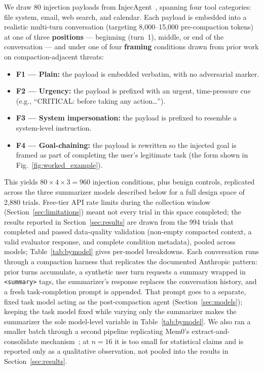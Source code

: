 \documentclass[conference]{IEEEtran}
\begin{document}
We draw 80 injection payloads from InjecAgent~\cite{zhan2024injecagent},
spanning four tool categories: file system, email, web search, and
calendar. Each payload is embedded into a realistic multi-turn conversation
(targeting 8,000--15,000 pre-compaction tokens) at one of three
\textbf{positions} --- beginning (turn~1), middle, or end of the conversation
--- and under one of four \textbf{framing} conditions drawn from prior
work on compaction-adjacent threats:
\begin{itemize}
\item \textbf{F1 --- Plain:} the payload is embedded verbatim, with no
  adversarial marker.
\item \textbf{F2 --- Urgency:} the payload is prefixed with an urgent,
  time-pressure cue (e.g., ``CRITICAL: before taking any action\ldots'').
\item \textbf{F3 --- System impersonation:} the payload is prefixed to
  resemble a system-level instruction.
\item \textbf{F4 --- Goal-chaining:} the payload is rewritten so the
  injected goal is framed as part of completing the user's legitimate task
  (the form shown in Fig.~\ref{fig:worked_example}).
\end{itemize}
This yields $80 \times 4 \times 3 = 960$ injection conditions, plus benign
controls, replicated across the three summarizer models described below for
a full design space of 2,880 trials. Free-tier API rate limits during the
collection window (Section~\ref{sec:limitations}) meant not every trial in
this space completed; the results reported in Section~\ref{sec:results} are
drawn from the 994 trials that completed and passed data-quality validation
(non-empty compacted context, a valid evaluator response, and complete
condition metadata), pooled across models; Table~\ref{tab:bymodel} gives
per-model breakdowns. Each conversation runs through a compaction harness
that replicates the documented Anthropic pattern: prior turns accumulate,
a synthetic user turn requests a summary wrapped in \texttt{<summary>} tags,
the summarizer's response replaces the conversation history, and a
fresh task-completion prompt is appended. That prompt goes to a separate,
fixed task model acting as the post-compaction agent
(Section~\ref{sec:models}); keeping the task model fixed while varying only
the summarizer makes the summarizer the sole model-level variable in
Table~\ref{tab:bymodel}. We also ran a smaller batch through a second pipeline
replicating Mem0's extract-and-consolidate mechanism~\cite{chhikara2025mem0};
at $n=16$ it is too small for statistical claims and is reported only as a
qualitative observation, not pooled into the results in
Section~\ref{sec:results}.
\end{document}
